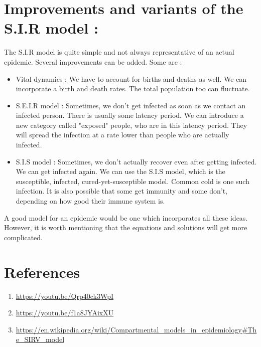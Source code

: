 \documentclass{article}
\begin{document}
\section*{Improvements and variants of the S.I.R model : }
The S.I.R model is quite simple and not always representative of an actual epidemic. Several improvements can be added. Some are :
\begin{itemize}
    \item Vital dynamics : We have to account for births and deaths as well. We can incorporate a birth and death rates. The total population too can fluctuate.
    \item S.E.I.R model : Sometimes, we don't get infected as soon as we contact an infected person. There is usually some latency period. We can introduce a new category called "exposed" people, who are in this latency period. They will spread the infection at a rate lower than people who are actually infected.
    \item S.I.S model : Sometimes, we don't actually recover even after getting infected. We can get infected again. We can use the S.I.S model, which is the susceptible, infected, cured-yet-susceptible model. Common cold is one such infection. It is also possible that some get immunity and some don't, depending on how good their immune system is. 
\end{itemize}    
A good model for an epidemic would be one which incorporates all these ideas. However, it is worth mentioning that the equations and solutions will get more complicated.
\section*{References}
\begin{enumerate}
    \item \url{https://youtu.be/Qrp40ck3WpI}
    \item \url{https://youtu.be/f1a8JYAixXU}
    \item \url{https://en.wikipedia.org/wiki/Compartmental_models_in_epidemiology#The_SIRV_model}
\end{enumerate}
\end{document}

